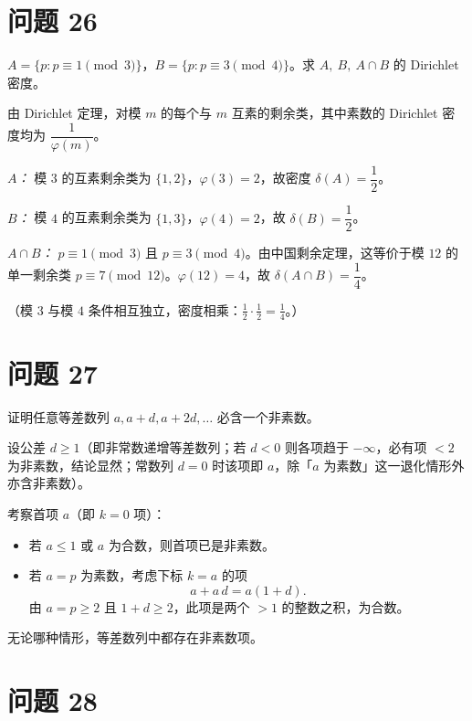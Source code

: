\documentclass{article}
\begin{document}
\section{问题 26}

$A=\{p:p\equiv1\!\!\pmod3\}$，$B=\{p:p\equiv3\!\!\pmod4\}$。求 $A,\ B,\ A\cap B$ 的 Dirichlet 密度。

\begin{solution}
  由 Dirichlet 定理，对模 $m$ 的每个与 $m$ 互素的剩余类，其中素数的 Dirichlet 密度均为 $\dfrac1{\varphi(m)}$。

  \emph{$A$：} 模 $3$ 的互素剩余类为 $\{1,2\}$，$\varphi(3)=2$，故密度 $\delta(A)=\dfrac1{2}$。

  \emph{$B$：} 模 $4$ 的互素剩余类为 $\{1,3\}$，$\varphi(4)=2$，故 $\delta(B)=\dfrac1{2}$。

  \emph{$A\cap B$：} $p\equiv1\pmod3$ 且 $p\equiv3\pmod4$。由中国剩余定理，这等价于模 $12$ 的单一剩余类 $p\equiv7\pmod{12}$。$\varphi(12)=4$，故 $\delta(A\cap B)=\dfrac1{4}$。

  （模 $3$ 与模 $4$ 条件相互独立，密度相乘：$\tfrac12\cdot\tfrac12=\tfrac14$。）
\end{solution}

\section{问题 27}

证明任意等差数列 $a,a+d,a+2d,\dots$ 必含一个非素数。

\begin{solution}
  设公差 $d\ge1$（即非常数递增等差数列；若 $d<0$ 则各项趋于 $-\infty$，必有项 $<2$ 为非素数，结论显然；常数列 $d=0$ 时该项即 $a$，除「$a$ 为素数」这一退化情形外亦含非素数）。

  考察首项 $a$（即 $k=0$ 项）：
  \begin{itemize}
    \item 若 $a\le1$ 或 $a$ 为合数，则首项已是非素数。
    \item 若 $a=p$ 为素数，考虑下标 $k=a$ 的项
    \[
      a+a\,d=a(1+d).
    \]
    由 $a=p\ge2$ 且 $1+d\ge2$，此项是两个 $>1$ 的整数之积，为合数。
  \end{itemize}
  无论哪种情形，等差数列中都存在非素数项。
\end{solution}

\section{问题 28}
\end{document}

